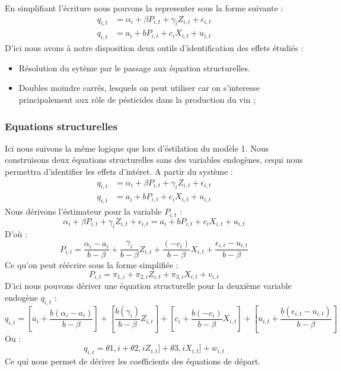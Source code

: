\documentclass[11pt, a4paper]{article}
\begin{document}
En simplifiant l'écriture nous pouvons la representer sous la forme suivante :
\begin{align*}
  q_{i,t} & = \alpha_{i} + \beta P_{i,t} + \gamma_{i} Z_{i,t} + \epsilon_{i,t} \\
  q_{i,t} & = a_i + b P_{i,t} + c_i X_{i,t} + u_{i,t}
\end{align*}
D'ici nous avons à notre disposition deux outils d'identification des effets étudiés :
\begin{itemize}
  \item Résolution du sytème par le passage aux équation structurelles.
  \item Doubles moindre carrés, lesquels on peut utiliser car on s'interesse principalement aux rôle de pésticides dans la production du vin ;
\end{itemize}

\subsubsection{Equations structurelles}
Ici nous suivons la même logique que lors d'éstilation du modèle 1.
Nous construisons deux équations structurelles sans des variables endogènes, cequi nous permettra d'identifier les effets d'intéret.
A partir du système :
\begin{align*}
  q_{i,t} & = \alpha_{i} + \beta P_{i,t} + \gamma_{i} Z_{i,t} + \epsilon_{i,t} \\
  q_{i,t} & = a_i + b P_{i,t} + c_i X_{i,t} + u_{i,t}
\end{align*}
Nous dérivons l'éstimateur pour la variable $P_{i,t}$ :
\begin{equation*}
  \alpha_{i} + \beta P_{i,t} + \gamma_{i} Z_{i,t} + \epsilon_{i,t} = 
  a_i + b P_{i,t} + c_i X_{i,t} + u_{i,t}
\end{equation*}
D'où :
\begin{equation*}
  P_{i,t} = \frac{\alpha_{i} - a_i}{b - \beta} + 
    \frac{\gamma_{i}}{b - \beta} Z_{i,t} + 
    \frac{(- c_i)}{b - \beta} X_{i,t} +
    \frac{\epsilon_{i,t} - u_{i,t}}{b - \beta}
\end{equation*}
Ce qu'on peut réécrire sous la forme simplifiée :
\begin{equation*}
  P_{i,t} = \pi_{1,i} + 
    \pi_{2,i} Z_{i,t} + 
    \pi_{3,i} X_{i,t} +
    v_{i,t}
\end{equation*}
D'ici nous pouvons dériver une équation structurelle pour la deuxième variable endogène $q_{i,t}$ :
\begin{equation*}
  q_{i,t} = [a_i + \frac{b (\alpha_{i} - a_i)}{b - \beta}] + 
    [\frac{b (\gamma_{i})}{b - \beta} Z_{i,t}] + 
    [c_i + \frac{b (- c_i)}{b - \beta} X_{i,t}] +
    [u_{i,t} + \frac{b (\epsilon_{i,t} - u_{i,t})}{b - \beta}]
\end{equation*}
Ou :
\begin{equation*}
  q_{i,t} = \theta{1,i} + 
    \theta{2,i} Z_{i,t}] + 
    \theta{3,i} X_{i,t}] +
    w_{i,t}
\end{equation*}
Ce qui nous permet de dériver les coefficients des équations de départ.
\end{document}

